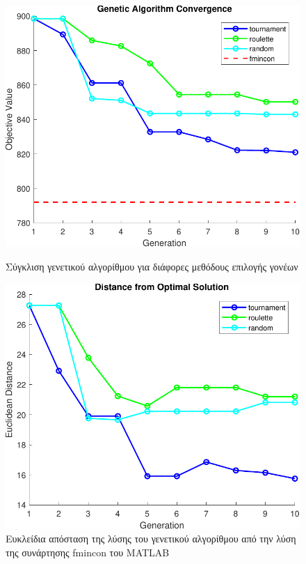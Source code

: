 \documentclass[a4paper,12pt]{article}
\begin{document}
\begin{figure}[h]
    \centering
    \begin{minipage}{0.45\textwidth}
        \centering
        \includegraphics[width=\linewidth]{plot/genetic_convergence.pdf}
        \caption{Σύγκλιση γενετικού αλγορίθμου για διάφορες μεθόδους επιλογής γονέων}
        \label{fig:genetic_convergence}
    \end{minipage}
    \hfill
    \begin{minipage}{0.45\textwidth}
        \centering
        \includegraphics[width=\linewidth]{plot/genetic_distance.pdf}
        \caption{Ευκλείδια απόσταση της λύσης του γενετικού αλγορίθμου από την λύση της συνάρτησης 
        fmincon του MATLAB}
        \label{fig:genetic_distance}
    \end{minipage}
\end{figure}
\end{document}
